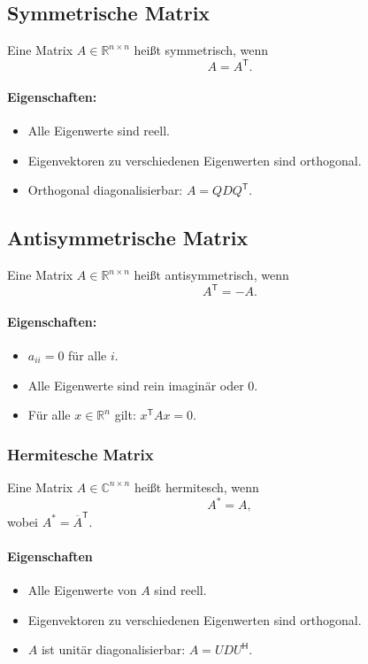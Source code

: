 \documentclass[10pt,a4paper,twocolumn]{article}
\begin{document}
	\subsection*{Symmetrische Matrix}
	
	Eine Matrix $A \in \mathbb{R}^{n\times n}$ heißt symmetrisch, wenn
	\[
	A = A^{\mathsf T}.
	\]
	
	\paragraph{Eigenschaften:}
	\begin{itemize}
		\item Alle Eigenwerte sind reell.
		\item Eigenvektoren zu verschiedenen Eigenwerten sind orthogonal.
		\item Orthogonal diagonalisierbar: $A = Q D Q^{\mathsf T}$.
	\end{itemize}
	
	\subsection{Antisymmetrische Matrix}
	Eine Matrix $A \in \mathbb{R}^{n\times n}$ heißt antisymmetrisch, wenn
	\[
	A^{\mathsf T} = -A.
	\]
	
	\paragraph{Eigenschaften:}
	\begin{itemize}
		\item $a_{ii} = 0$ für alle $i$.
		\item Alle Eigenwerte sind rein imaginär oder $0$.
		\item Für alle $x \in \mathbb{R}^n$ gilt: $x^{\mathsf T} A x = 0$.
	\end{itemize}
	
	\subsubsection*{Hermitesche Matrix}
	
	Eine Matrix $A \in \mathbb{C}^{n\times n}$ heißt hermitesch, wenn
	\[
	A^{\mathsf *} = A,
	\]
	wobei $A^{\mathsf *} = \overline{A}^{\mathsf T}$.
	
	\paragraph{Eigenschaften}
	\begin{itemize}
		\item Alle Eigenwerte von $A$ sind reell.
		\item Eigenvektoren zu verschiedenen Eigenwerten sind orthogonal.
		\item $A$ ist unitär diagonalisierbar: $A = U D U^{\mathsf H}$.
	\end{itemize}
	
\end{document}
